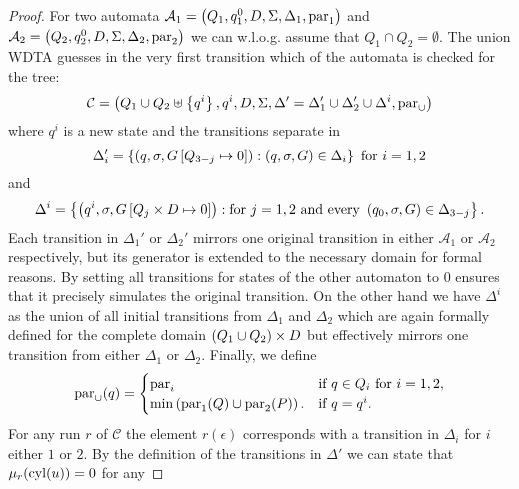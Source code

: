 \begin{proof}
  For two automata
  $\mathcal{A}_{1} = \left(Q_{1}, q^{0}_{1}, D, \Sigma, \Delta_{1}, 
    \operatorname{par}_{1}\right)$ and $\mathcal{A}_{2} = \left(Q_{2}, q^{0}_{2}, D, \Sigma, 
  \Delta_{2}, \operatorname{par}_{2}\right)$ we can w.l.o.g. assume that 
  $Q_{1}\cap Q_{2} = \emptyset$. The union \ac{WDTA} guesses 
  in the very first transition which of the automata is checked for the tree:
  \begin{equation*}
    \mathcal{C} = \left(Q_{1}\cup Q_{2}\uplus\left\{q^{i}\right\}, q^{i}, D, \Sigma,
    \Delta' = \Delta_{1}'\cup\Delta_{2}'\cup\Delta^{i},\operatorname{par}_{\cup}\right)
  \end{equation*}
  where $q^{i}$ is a new state and the transitions separate in
  \begin{equation*}
    \Delta_{i}' = \left\{
      \left(q,\sigma,G\left[Q_{3-j}\mapsto 0\right]\right):
        \left(q,\sigma,G\right)\in\Delta_{i}
    \right\}\text{ for }i = 1,2
  \end{equation*}
  and
  \begin{equation*}
    \Delta^{i} = \left\{
      \left(q^{i},\sigma,G\left[Q_{j}\times D\mapsto 0\right]\right):
        \text{for }j = 1,2 \text{ and every } 
        \left(q_{0},\sigma,G\right)\in\Delta_{3-j}
    \right\}.
  \end{equation*}
  Each transition in $\Delta_{1}'$ or $\Delta_{2}'$ mirrors one original 
  transition in either $\mathcal{A}_{1}$ or $\mathcal{A}_{2}$ respectively, but
  its generator is extended to the necessary domain for formal reasons. By 
  setting all transitions for states of the other automaton to $0$ ensures that
  it precisely simulates the original transition. On the other hand we have
  $\Delta^{i}$ as the union of all initial transitions from 
  $\Delta_{1}$ and $\Delta_{2}$ which are again formally defined for the 
  complete domain $\left(Q_{1}\cup Q_{2}\right)\times D$ but effectively mirrors one
  transition from either $\Delta_{1}$ or $\Delta_{2}$. Finally, we define
  \begin{equation*}
    \operatorname{par}_{\cup}(q) = \begin{cases}
      \operatorname{par}_{i}&\text{if }q\in Q_{i}\text{ for }i = 1,2,\\
      \min\left(\operatorname{par}_{1}(Q)\cup\operatorname{par}_{2}(P)\right).&\text{if }q = q^{i}.
    \end{cases}
  \end{equation*}
  For any run $r$ of $\mathcal{C}$ the element $r(\epsilon)$ corresponds with a
  transition in $\Delta_{i}$ for $i$ either $1$ or $2$. By the definition of
  the transitions in $\Delta'$ we can state that $\mu_{r}(\operatorname{cyl}(u)) = 0$ for any

\end{proof}
